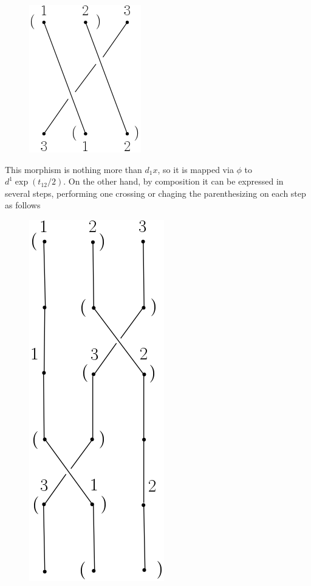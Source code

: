 \documentclass[TFM.tex]{subfiles}
\begin{document}
\begin{figure}[h!]
\includegraphics[scale=0.53]{Imagenes/left}
\end{figure}
This morphism is nothing more than $d_1x$, so it is mapped via $\phi$ to $d^1\exp(t_{12}/2)$. On the other hand, by composition it can be expressed in several steps, performing one crossing or chaging the parenthesizing on each step as follows

\begin{figure}[h!]
\includegraphics[scale=0.53]{Imagenes/right}
\end{figure}
\end{document}
